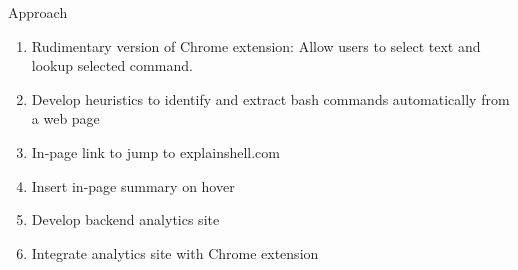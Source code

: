\documentclass[xcolor=dvipsnames]{beamer}
\begin{document}
\begin{frame}{Approach}
\begin{enumerate}
\def\labelenumi{\arabic{enumi}.}
\itemsep6pt\parskip0pt
\item<1->
  Rudimentary version of Chrome extension: Allow users to select text
  and lookup selected command.
\item<4->
  Develop heuristics to identify and extract bash commands automatically
  from a web page
\item<5->
  In-page link to jump to explainshell.com
\item<8->
  Insert in-page summary on hover
\item<11->
  Develop backend analytics site
\item<12->
  Integrate analytics site with Chrome extension
\end{enumerate}
\end{frame}
\end{document}
